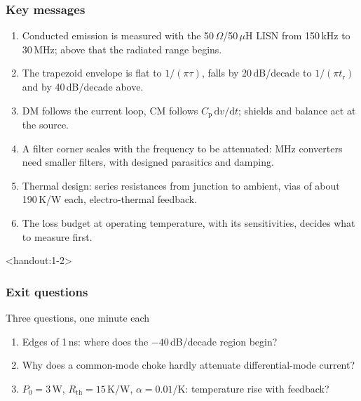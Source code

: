 \begin{frame}
	\frametitle{Key messages}
	\begin{enumerate}
		\item Conducted emission is measured with the 50\,$\Omega$/50\,$\mu$H LISN from 150\,kHz to 30\,MHz; above that the radiated range begins.
		\item The trapezoid envelope is flat to $1/(\pi\tau)$, falls by 20\,dB/decade to $1/(\pi t_\mathrm{r})$ and by 40\,dB/decade above.
		\item DM follows the current loop, CM follows $C_\mathrm{p}\,\mathrm{d}v/\mathrm{d}t$; shields and balance act at the source.
		\item A filter corner scales with the frequency to be attenuated: MHz converters need smaller filters, with designed parasitics and damping.
		\item Thermal design: series resistances from junction to ambient, vias of about 190\,K/W each, electro-thermal feedback.
		\item The loss budget at operating temperature, with its sensitivities, decides what to measure first.
	\end{enumerate}
\end{frame}

\begin{frame}<handout:1-2>
	\frametitle{Exit questions}
	\begin{varblock}[\textwidth]{Three questions, one minute each}
		\begin{enumerate}
			\item Edges of 1\,ns: where does the $-40$\,dB/decade region begin?
			\item Why does a common-mode choke hardly attenuate differential-mode current?
			\item $P_0=3$\,W, $R_\mathrm{th}=15$\,K/W, $\alpha=0.01$/K: temperature rise with feedback?
		\end{enumerate}
	\end{varblock}
\end{frame}

